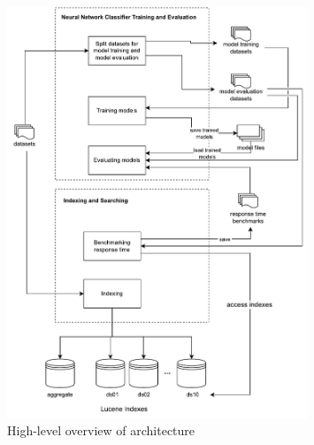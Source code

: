 \begin{figure}[!th]
	\centering
%	
	\includegraphics[width=0.8\textwidth]{my/graphics/overall_architecture.pdf}
	\caption{High-level overview of architecture}
	\label{fig:proj_arch}
\end{figure}

